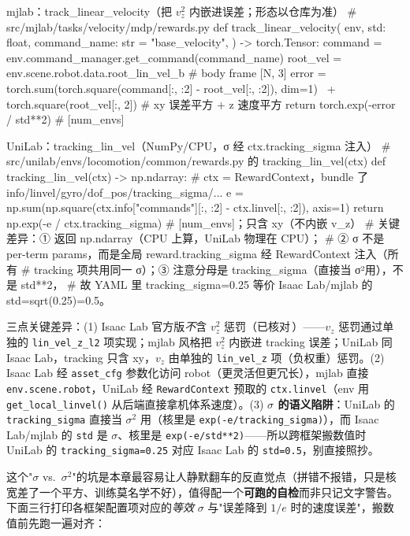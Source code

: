 \begin{codebox}[Python]{mjlab：track\_linear\_velocity（把 $v_z^2$ 内嵌进误差；形态以仓库为准）}
# src/mjlab/tasks/velocity/mdp/rewards.py
def track_linear_velocity(
    env, std: float, command_name: str = "base_velocity",
) -> torch.Tensor:
    command = env.command_manager.get_command(command_name)
    root_vel = env.scene.robot.data.root_lin_vel_b        # body frame [N, 3]
    error = torch.sum(torch.square(command[:, :2] - root_vel[:, :2]), dim=1) \
            + torch.square(root_vel[:, 2])                # xy 误差平方 + z 速度平方
    return torch.exp(-error / std**2)                     # [num_envs]
\end{codebox}

\begin{codebox}[Python]{UniLab：tracking\_lin\_vel（NumPy/CPU，σ 经 ctx.tracking\_sigma 注入）}
# src/unilab/envs/locomotion/common/rewards.py 的 tracking_lin_vel(ctx)
def tracking_lin_vel(ctx) -> np.ndarray:
    # ctx = RewardContext，bundle 了 info/linvel/gyro/dof_pos/tracking_sigma/...
    e = np.sum(np.square(ctx.info["commands"][:, :2] - ctx.linvel[:, :2]), axis=1)
    return np.exp(-e / ctx.tracking_sigma)   # [num_envs]；只含 xy（不内嵌 v_z）
# 关键差异：① 返回 np.ndarray（CPU 上算，UniLab 物理在 CPU）；
#   ② σ 不是 per-term params，而是全局 reward.tracking_sigma 经 RewardContext 注入（所有
#      tracking 项共用同一 σ）；③ 注意分母是 tracking_sigma（直接当 σ²用），不是 std**2，
#      故 YAML 里 tracking_sigma=0.25 等价 Isaac Lab/mjlab 的 std=sqrt(0.25)=0.5。
\end{codebox}

三点关键差异：(1) Isaac Lab 官方版\emph{不}含 $v_z^2$ 惩罚（已核对\,\cite{isaaclab2024}）——$v_z$ 惩罚通过单独的 \verb|lin_vel_z_l2| 项实现；mjlab 风格把 $v_z^2$ 内嵌进 tracking 误差；UniLab 同 Isaac Lab，tracking 只含 xy，$v_z$ 由单独的 \verb|lin_vel_z| 项（负权重）惩罚。(2) Isaac Lab 经 \verb|asset_cfg| 参数化访问 robot（更灵活但更冗长），mjlab 直接 \verb|env.scene.robot|，UniLab 经 \verb|RewardContext| 预取的 \verb|ctx.linvel|（env 用 \verb|get_local_linvel()| 从后端直接拿机体系速度）。(3) \textbf{$\sigma$ 的语义陷阱}：UniLab 的 \verb|tracking_sigma| 直接当 $\sigma^2$ 用（核里是 \verb|exp(-e/tracking_sigma)|），而 Isaac Lab/mjlab 的 \verb|std| 是 $\sigma$、核里是 \verb|exp(-e/std**2)|——所以跨框架搬数值时 UniLab 的 \verb|tracking_sigma=0.25| 对应 Isaac Lab 的 \verb|std=0.5|，别直接照抄。

这个"$\sigma$ vs.\ $\sigma^2$"的坑是本章最容易让人静默翻车的反直觉点（拼错不报错，只是核宽差了一个平方、训练莫名学不好），值得配一个\textbf{可跑的自检}而非只记文字警告。下面三行打印各框架配置项对应的\emph{等效} $\sigma$ 与"误差降到 $1/e$ 时的速度误差"，搬数值前先跑一遍对齐：

